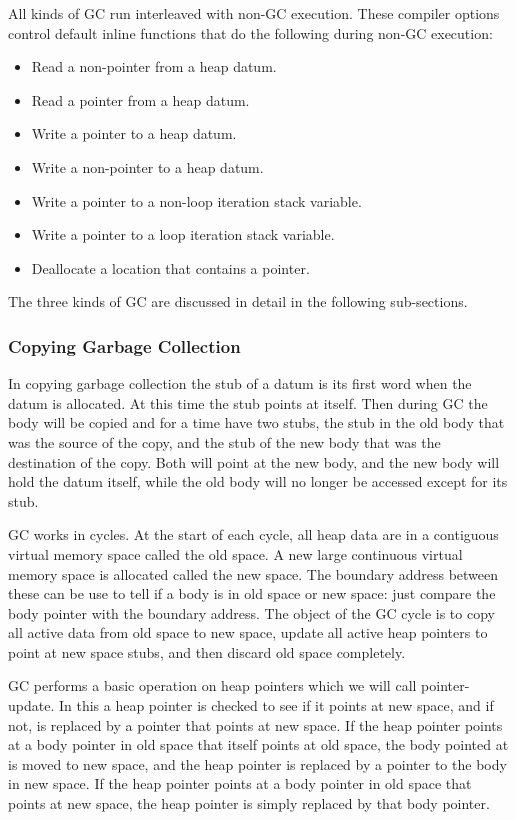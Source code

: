\documentclass[12pt]{article}
\begin{document}
All kinds of GC run interleaved with non-GC execution.
These compiler options control default inline functions that do the
following during non-GC execution:
\begin{itemize}
\item Read a non-pointer from a heap datum.
\item Read a pointer from a heap datum.
\item Write a pointer to a heap datum.
\item Write a non-pointer to a heap datum.
\item Write a pointer to a non-loop iteration stack variable.
\item Write a pointer to a loop iteration stack variable.
\item Deallocate a location that contains a pointer.
\end{itemize}

The three kinds of GC are discussed in detail in the following sub-sections.


\subsubsection{Copying Garbage Collection}

In copying garbage collection the stub of a datum is its
first word when the datum is allocated.  At this time the
stub points at itself.  Then during GC the body will be
copied and for a time have two stubs, the stub in the old
body that was the source of the copy, and the stub of the
new body that was the destination of the copy.  Both will
point at the new body, and the new body will hold the
datum itself, while the old body will no longer be accessed
except for its stub.

GC works in cycles.  At the start of each cycle, all heap
data are in a contiguous virtual memory space called the
old space.  A new large continuous virtual memory space
is allocated called the new space.  The boundary address
between these can be use to tell if a body is in old space
or new space: just compare the body pointer with the boundary
address.  The object of the GC cycle is to copy all active
data from old space to new space, update all active heap pointers
to point at new space stubs, and then discard old space
completely.

GC performs a basic operation on heap pointers which
we will call pointer-update.  In this a heap pointer is
checked to see if it points at new space, and if not,
is replaced by a pointer that points at new space.
If the heap pointer points at a body pointer in old space
that itself points at old space, the body pointed at is
moved to new space, and the heap pointer is replaced by
a pointer to the body in new space.  If the heap pointer
points at a body pointer in old space that points at new space, the
heap pointer is simply replaced by that body pointer.
\end{document}
